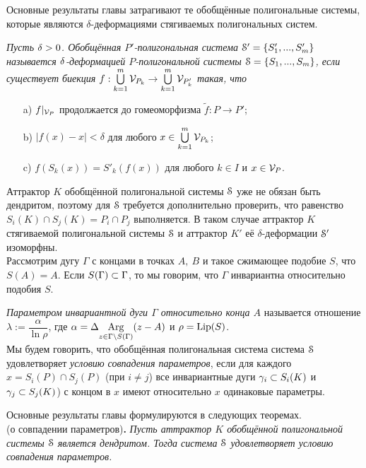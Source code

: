 \documentclass[a5paper,9pt,twoside]{extarticle} %
\begin{document}
Основные результаты главы затрагивают те обобщённые полигональные системы, которые являются $\delta$-деформациями стягиваемых полигональных систем.

{\em Пусть $\delta>0$. Обобщённая $P'$-полигональная система ${\EuScript S}'=\{S'_1,...,S'_m\}$ называется $\delta$-деформацией $P$-полигональной системы ${\EuScript S}=\{S_1,...,S_m\}$, если существует биекция $f:\bigcup\limits_{k=1}^m {\mathcal V}_{P_k}\to \bigcup\limits_{k=1}^m {\mathcal V}_{P'_k}$ такая, что
\begin{itemize}[nolistsep]
\item[a)] $f|_{{\mathcal V}_P}$ продолжается до гомеоморфизма $\tilde f: P\to P'$;
\item[b)] $|f(x)-x|<\delta$ для любого $x\in \bigcup\limits_{k=1}^m {\mathcal V}_{P_k}$;
\item[c)] $f(S_k(x))=S'_k(f(x))$ для любого $k\in I$ и $x\in {\mathcal V}_P$.
\end{itemize} }

Аттрактор $K$ обобщённой полигональной системы ${\EuScript S}$ уже не обязан быть дендритом, поэтому для ${\EuScript S}$ требуется дополнительно проверить, что равенство $S_i(K)\cap S_j(K)=P_i\cap P_j$ выполняется.
В таком случае аттрактор $K$ стягиваемой полигональной системы ${\EuScript S}$ и аттрактор $K'$ её $\delta$-деформации ${\EuScript S}'$ изоморфны.\\

Рассмотрим дугу $\Gamma$ с концами в точках $A,\ B$ и такое сжимающее подобие $S$, что $S(A)=A$.
Если $S(\Gamma)\subset\Gamma$, то мы говорим, что $\Gamma$ инвариантна относительно подобия $S$.

{\em Параметром инвариантной дуги $\Gamma$ относительно конца $A$} называется отношение $\lambda:=\dfrac{\alpha}{\ln\rho}$, где $\alpha=\Delta\underset{{z\in\Gamma\setminus S(\Gamma)}}{\mathrm {Arg}}(z-A)$ и $\rho=\mathop{\rm Lip} \nolimits(S)$.\\

Мы будем говорить, что обобщённая полигональная система система ${\EuScript S}$ удовлетворяет {\em условию совпадения параметров}, если для каждого \linebreak $x=S_i(P)\cap S_j(P)$ (при $i\neq j$) все инвариантные дуги $\gamma_i\subset S_i(K)$ и $\gamma_j\subset S_j(K)$) с концом в $x$ имеют относительно $x$ одинаковые параметры.

Основные результаты главы формулируются в следующих теоремах.\\

 (о совпадении параметров){\bf .}
{\em
Пусть аттрактор $K$ обобщённой полигональной системы ${\EuScript S}$ является дендритом.
Тогда система ${\EuScript S}$ удовлетворяет условию совпадения параметров.}\\
\end{document}
